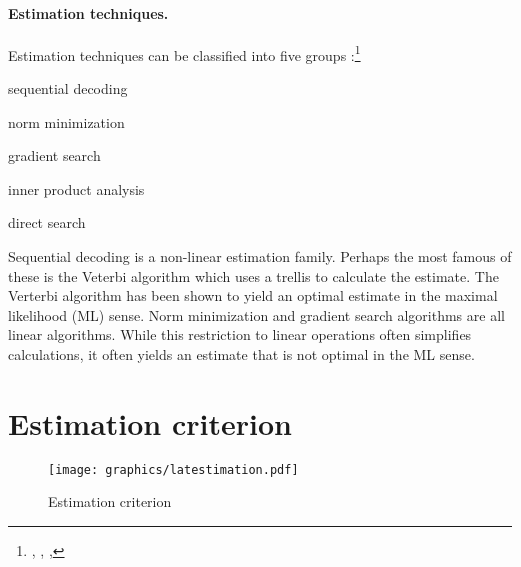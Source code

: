 \paragraph{Estimation techniques.}
\label{ref:sec:parameter-est}
Estimation techniques can be classified into
five groups :\footnote{%
  ,
  ,
  ,
  }
\begin{enume}
   \item sequential decoding
   \item norm minimization
   \item gradient search
   \item inner product analysis
   \item direct search
\end{enume}

Sequential decoding is a non-linear estimation family.
Perhaps the most famous of these is the Veterbi algorithm which
uses a trellis to calculate the estimate.
The Verterbi algorithm has been shown to yield an optimal estimate
in the maximal likelihood (ML) sense.
Norm minimization and gradient search algorithms are all linear algorithms.
While this restriction to linear operations often simplifies calculations,
it often yields an estimate that is not optimal in the ML sense.

\section{Estimation criterion}
\label{sec:est_criterion}
\begin{figure}
\centering%
\texttt{[image: graphics/latestimation.pdf]}
\caption{
   Estimation criterion
   \label{fig:est-criterion}
   }
\end{figure}

